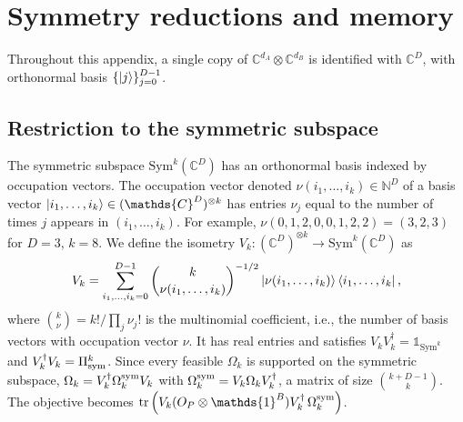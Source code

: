 \documentclass[11pt,a4paper]{report}
\newcommand{\one}{\mathds{1}}
\newcommand{\I}{\one}
\newcommand{\N}{\mathds{N}}
\newcommand{\C}{\mathds{C}}
\newcounter{reptag}
\newif\iftags \tagsfalse   %
\newcommand{\reptagbox}[3]{\iftags\par\smallskip\noindent\refstepcounter{reptag}%
  \fcolorbox{#1}{#1!7}{\parbox{\dimexpr\linewidth-2\fboxsep-2\fboxrule\relax}{\small
  \textcolor{#1}{\textbf{[\thereptag]\ #2.}}\ #3}}\par\smallskip\fi}
\newcommand{\detail}[1]{\reptagbox{tagD}{More detail}{#1}}
\begin{document}
\chapter{Symmetry reductions and memory}\label{app:SymRed}
Throughout this appendix, a single copy of $\C^{d_A}\otimes\C^{d_B}$ is identified with $\C^D$, with orthonormal basis $\{\ket{j}\}_{j=0}^{D-1}$.

\section{Restriction to the symmetric subspace}
The symmetric subspace $\text{Sym}^k(\C^D)$ has an orthonormal basis indexed by occupation vectors. The occupation vector denoted $\nu(i_1,\dots,i_k)\in\N^D$ of a basis vector $\ket{i_1,\dots,i_k}\in(\C^D)^{\otimes k}$ has entries $\nu_j$ equal to the number of times $j$ appears in $(i_1,\dots,i_k)$. For example, $\nu(0,1,2,0,0,1,2,2)=(3,2,3)$ for $D=3$, $k=8$. We define the isometry $V_k:(\C^D)^{\otimes k}\to\text{Sym}^k(\C^D)$ as
\begin{equation}
    V_k = \sum_{i_1, \dots, i_k=0}^{D-1} \binom{k}{\nu(i_1, \dots, i_k)}^{-1/2}\ket{\nu(i_1, \dots, i_k)}\bra{i_1, \dots, i_k},
\end{equation}
where $\binom{k}{\nu}=k!/\prod_j\nu_j!$ is the multinomial coefficient, i.e., the number of basis vectors with occupation vector $\nu$. It has real entries and satisfies $V_kV_k^\dagger=\I_{\text{Sym}^k}$ and $V_k^\dagger V_k=\Pi_{\rm sym}^{k}$. Since every feasible $\Omega_k$ is supported on the symmetric subspace, $\Omega_k=V_k^\dagger\Omega_k^{\rm sym}V_k$ with $\Omega_k^{\rm sym}=V_k\Omega_kV_k^\dagger$, a matrix of size $\binom{k+D-1}{k}$. The objective becomes $\tr\left(V_k(O_P\otimes\I^B)V_k^\dagger\,\Omega_k^{\rm sym}\right)$.
\detail{Add a small worked example of the occupation basis ($D=2$, $k=2$: the three states $\ket{2,0},\ket{1,1},\ket{0,2}$ and $V_2$ as a $3\times4$ matrix).}
\end{document}
